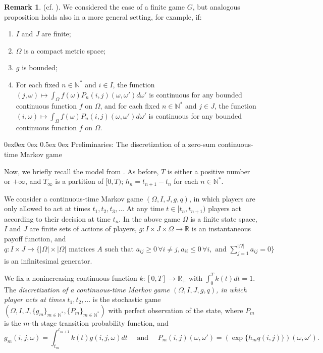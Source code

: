 \documentclass[english,openary,12pt]{article}
\makeatletter
\renewcommand\subsubsection{\@startsection{subsubsection}{3}{\z@}%
                                     {0ex\@plus 0ex \@minus 0ex}%
                                     {0.5ex \@plus 0ex}%
                                     {\normalfont\large\bfseries}}%
\theoremstyle{definition}
\newtheorem{remark}{Remark}
\newcommand{\R}{\mathbb{R}}
\newcommand{\N}{\mathbb{N}}
\makeatother
\begin{document}
\begin{remark}
\label{rrff3}
(cf. \cite{MerSorZam15}).
We considered the case of a finite game $G$, but analogous proposition holds also in a more general setting, for example, if:
\begin{enumerate}
  \item $I$ and $J$ are finite;
  \item $\Omega$ is a compact metric space;
  \item $g$ is bounded;
  \item For each fixed $n \in \N^*$ and $i \in I$, 
  the function 
  $(j, \omega) \mapsto 
  \int_\Omega f(\omega) P_n(i,j)(\omega, \omega') d \omega'$ 
  is continuous for any 
  bounded continuous function $f$ on $\Omega$, and for each fixed 
  $n \in \N^*$ and $j \in J$, the function 
  $(i, \omega) \mapsto 
  \int_\Omega f(\omega) P_n(i,j)(\omega, \omega') d \omega'$ 
  is continuous for any bounded continuous function $f$ on $\Omega$.
\end{enumerate}
\end{remark}

\subsubsection{Preliminaries: The discretization of a zero-sum continuous-time Markov game}

\label{cc01}
Now, we briefly recall the model from \cite{Sor17}.
As before, $T$ is either a positive number or $+\infty$, and $T_\infty$ is a partition of $[0,T)$;  $h_n = t_{n+1}-t_n$ for each $n \in \N^*$.

We consider a continuous-time Markov game $(\Omega, I, J, g, q)$, in which players are only allowed to act at times $t_1, t_2, t_3, \ldots$ At any time $t \in [t_n, t_{n+1})$ players act according to their decision at time $t_n$. In the above game $\Omega$ is a finite state space, $I$ and $J$ are finite sets of actions of players, $g : I \times J \times \Omega \to \R$ is an instantaneous payoff function, and 
$q : I \times J \to \{|\Omega| \times |\Omega| \text{ matrices } A \text{ such that }a_{i j} \ge 0 \, \forall i \neq j, a_{i i} \le 0 \,\forall i, \text{ and } \sum_{j = 1}^{|\Omega|} a_{i j} = 0\}$ is an infinitesimal generator.

We fix a nonincreasing continuous function $k : [0,T] \to \R_+$ with $\int_{0}^T k(t) dt = 1$. The \emph{discretization of a continuous-time Markov game $(\Omega, I, J, g, q)$, in which player acts at times $t_1, t_2, \ldots$} is the stochastic game
$(\Omega, I, J, \{g_m\}_{m\in\N^*}, \{P_m\}_{m\in\N^*})$ with perfect observation of the state, where $P_m$ is the $m$-th stage transition probability function, and 
$$g_m(i,j,\omega) = \int_{t_m}^{t_{m+1}} k(t) g(i, j, \omega) dt
\quad \text{ and } \quad 
P_m(i,j)(\omega,\omega') = (\exp\{h_m q(i,j)\})(\omega,\omega').$$
\end{document}

